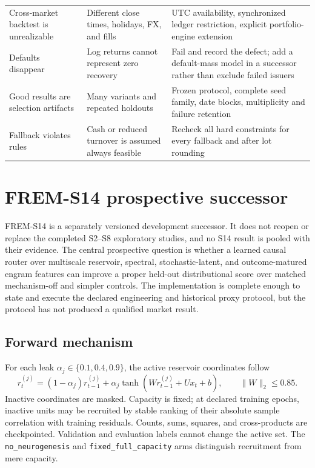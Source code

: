 \documentclass[11pt,a4paper]{article}
\begin{document}
\begin{longtable}{>{\raggedright\arraybackslash}p{.23\linewidth}>{\raggedright\arraybackslash}p{.31\linewidth}>{\raggedright\arraybackslash}p{.37\linewidth}}
Cross-market backtest is unrealizable & Different close times, holidays, FX, and fills & UTC availability, synchronized ledger restriction, explicit portfolio-engine extension \\
Defaults disappear & Log returns cannot represent zero recovery & Fail and record the defect; add a default-mass model in a successor rather than exclude failed issuers \\
Good results are selection artifacts & Many variants and repeated holdouts & Frozen protocol, complete seed family, date blocks, multiplicity and failure retention \\
Fallback violates rules & Cash or reduced turnover is assumed always feasible & Recheck all hard constraints for every fallback and after lot rounding \\
\bottomrule
\end{longtable}

\section{FREM-S14 prospective successor}
\label{sec:s14}

FREM-S14 is a separately versioned development successor. It does not reopen or
replace the completed S2--S8 exploratory studies, and no S14 result is pooled
with their evidence. The central prospective question is whether a learned
causal router over multiscale reservoir, spectral, stochastic-latent, and
outcome-matured engram features can improve a proper held-out distributional
score over matched mechanism-off and simpler controls. The implementation is
complete enough to state and execute the declared engineering and historical
proxy protocol, but the protocol has not produced a qualified market result.

\subsection{Forward mechanism}

For each leak $\alpha_j\in\{0.1,0.4,0.9\}$, the active reservoir coordinates
follow
\begin{equation}
r^{(j)}_t=(1-\alpha_j)r^{(j)}_{t-1}
 +\alpha_j\tanh(Wr^{(j)}_{t-1}+Ux_t+b),
\qquad \lVert W\rVert_2\le 0.85.
\end{equation}
Inactive coordinates are masked. Capacity is fixed; at declared training
epochs, inactive units may be recruited by stable ranking of their absolute
sample correlation with training residuals. Counts, sums, squares, and
cross-products are checkpointed. Validation and evaluation labels cannot
change the active set. The \texttt{no\_neurogenesis} and
\texttt{fixed\_full\_capacity} arms distinguish recruitment from mere capacity.
\end{document}

